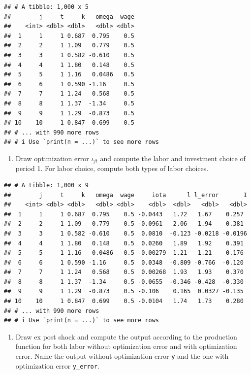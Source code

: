 \documentclass[
]{book}
\providecommand{\tightlist}{%
  \setlength{\itemsep}{0pt}\setlength{\parskip}{0pt}}
\begin{document}
\begin{verbatim}
## # A tibble: 1,000 x 5
##        j     t     k   omega  wage
##    <int> <dbl> <dbl>   <dbl> <dbl>
##  1     1     1 0.687  0.795    0.5
##  2     2     1 1.09   0.779    0.5
##  3     3     1 0.582 -0.610    0.5
##  4     4     1 1.80   0.148    0.5
##  5     5     1 1.16   0.0486   0.5
##  6     6     1 0.590 -1.16     0.5
##  7     7     1 1.24   0.568    0.5
##  8     8     1 1.37  -1.34     0.5
##  9     9     1 1.29  -0.873    0.5
## 10    10     1 0.847  0.699    0.5
## # ... with 990 more rows
## # i Use `print(n = ...)` to see more rows
\end{verbatim}

\begin{enumerate}
\def\labelenumi{\arabic{enumi}.}
\setcounter{enumi}{6}
\tightlist
\item
  Draw optimization error \(\iota_{jt}\) and compute the labor and investment choice of period 1. For labor choice, compute both types of labor choices.
\end{enumerate}

\begin{verbatim}
## # A tibble: 1,000 x 9
##        j     t     k   omega  wage     iota      l l_error       I
##    <int> <dbl> <dbl>   <dbl> <dbl>    <dbl>  <dbl>   <dbl>   <dbl>
##  1     1     1 0.687  0.795    0.5 -0.0443   1.72   1.67    0.257 
##  2     2     1 1.09   0.779    0.5 -0.0961   2.06   1.94    0.381 
##  3     3     1 0.582 -0.610    0.5  0.0810  -0.123 -0.0218 -0.0196
##  4     4     1 1.80   0.148    0.5  0.0260   1.89   1.92    0.391 
##  5     5     1 1.16   0.0486   0.5 -0.00279  1.21   1.21    0.176 
##  6     6     1 0.590 -1.16     0.5  0.0348  -0.809 -0.766  -0.120 
##  7     7     1 1.24   0.568    0.5  0.00268  1.93   1.93    0.370 
##  8     8     1 1.37  -1.34     0.5 -0.0655  -0.346 -0.428  -0.330 
##  9     9     1 1.29  -0.873    0.5 -0.106    0.165  0.0327 -0.135 
## 10    10     1 0.847  0.699    0.5 -0.0104   1.74   1.73    0.280 
## # ... with 990 more rows
## # i Use `print(n = ...)` to see more rows
\end{verbatim}

\begin{enumerate}
\def\labelenumi{\arabic{enumi}.}
\setcounter{enumi}{7}
\tightlist
\item
  Draw ex post shock and compute the output according to the production function for both labor without optimization error and with optimization error. Name the output without optimization error \texttt{y} and the one with optimization error \texttt{y\_error}.
\end{enumerate}
\end{document}
